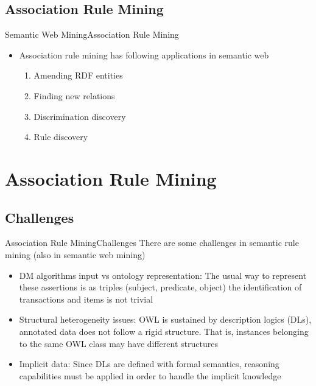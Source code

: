 \documentclass[10pt]{beamer}
\begin{document}
\subsection{Association Rule Mining}
\begin{frame}{Semantic Web Mining}{Association Rule Mining}
\begin{itemize}
		 
	\item Association rule mining has following applications in semantic web
		\begin{enumerate}
			\item Amending RDF entities \cite{abedjan2014amending}
			\item Finding new relations \cite{abedjan2013improving}
			\item Discrimination discovery \cite{luong2016classification}
			\item Rule discovery \cite{barati2017mining}
			
		\end{enumerate}
\end{itemize}
\end{frame}

\section{Association Rule Mining}
\subsection{Challenges}
\begin{frame}{Association Rule Mining}{Challenges}
	There are some challenges in semantic rule mining (also in semantic web mining)  \cite{nebot2012finding}
	\begin{itemize}
		 
		\item  DM algorithms input vs ontology representation: The usual way to represent these assertions is as triples (subject, predicate, object) the identification of transactions and items is not trivial
		\item Structural heterogeneity issues: OWL is sustained by description logics (DLs), annotated data does not follow a rigid structure. That is, instances belonging to the same OWL class may have different structures
		\item Implicit data: Since DLs are defined with formal semantics, reasoning capabilities must be applied in order to handle the implicit knowledge 
	\end{itemize}
\end{frame}
\end{document}
